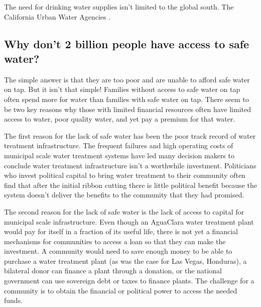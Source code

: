 \documentclass[letterpaper,10pt,english]{sphinxmanual}
\begin{document}
The need for drinking water supplies isn’t limited to the global south. The California Urban Water Agencies .


\subsection{Why don’t 2 billion people have access to safe water?}
\label{\detokenize{Introduction/Introduction:why-don-t-2-billion-people-have-access-to-safe-water}}\label{\detokenize{Introduction/Introduction:heading-2-billion-without-access-to-safe-water}}
The simple answer is that they are too poor and are unable to afford safe water on tap. But it isn’t that simple! Families without access to safe water on tap often spend more for water than families with safe water on tap. There seem to be two key reasons why those with limited financial resources often have limited access to water, poor quality water, and yet pay a premium for that water.

The first reason for the lack of safe water has been the poor track record of water treatment infrastructure. The frequent failures and high operating costs of municipal scale water treatment systems have led many decision makers to conclude water treatment infrastructure isn’t a worthwhile investment. Politicians who invest political capital to bring water treatment to their community often find that after the initial ribbon cutting there is little political benefit because the system doesn’t deliver the benefits to the community that they had promised.

The second reason for the lack of safe water is the lack of access to capital for municipal scale infrastructure. Even though an AguaClara water treatment plant would pay for itself in a fraction of its useful life, there is not yet a financial mechanisms for communities to access a loan so that they can make the investment. A community would need to save enough money to be able to purchase a water treatment plant (as was the case for Las Vegas, Honduras), a bilateral donor can finance a plant through a donation, or the national government can use sovereign debt or taxes to finance plants. The challenge for a community is to obtain the financial or political power to access the needed funds.
\end{document}
